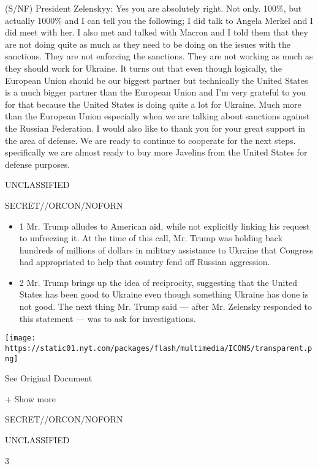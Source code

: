 (S/NF) President Zelenskyy: Yes you are absolutely right. Not only.
100\%, but actually 1000\% and I can tell you the following; I did talk
to Angela Merkel and I did meet with her. I also met and talked with
Macron and I told them that they are not doing quite as much as they
need to be doing on the issues with the sanctions. They are not
enforcing the sanctions. They are not working as much as they should
work for Ukraine. It turns out that even though logically, the European
Union should be our biggest partner but technically the United States is
a much bigger partner than the European Union and I'm very grateful to
you for that because the United States is doing quite a lot for Ukraine.
Much more than the European Union especially when we are talking about
sanctions against the Russian Federation. I would also like to thank you
for your great support in the area of defense. We are ready to continue
to cooperate for the next steps. specifically we are almost ready to buy
more Javelins from the United States for defense purposes.

UNCLASSIFIED

SECRET//ORCON/NOFORN

\begin{itemize}
\tightlist
\item
  1 Mr. Trump alludes to American aid, while not explicitly linking his
  request to unfreezing it. At the time of this call, Mr. Trump was
  holding back hundreds of millions of dollars in military assistance to
  Ukraine that Congress had appropriated to help that country fend off
  Russian aggression.
\item
  2 Mr. Trump brings up the idea of reciprocity, suggesting that the
  United States has been good to Ukraine even though something Ukraine
  has done is not good. The next thing Mr. Trump said --- after Mr.
  Zelensky responded to this statement --- was to ask for
  investigations.
\end{itemize}

\protect\hyperlink{}{}

\texttt{[image: https://static01.nyt.com/packages/flash/multimedia/ICONS/transparent.png]}

See Original Document

+ Show more

SECRET//ORCON/NOFORN

UNCLASSIFIED

3

